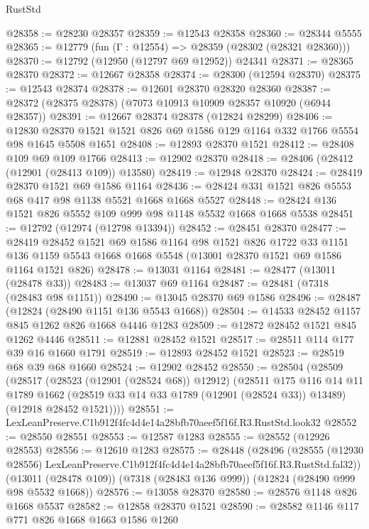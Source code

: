 \begin{lexlean}{RustStd}
\begin{coremodule}
@28358 := @28230 @28357
@28359 := @12543 @28358
@28360 := @28344 @5555
@28365 := @12779 (fun (Γ : @12554) => @28359 (@28302 (@28321 @28360)))
@28370 := @12792 (@12950 (@12797 @69 @12952)) @24341
@28371 := @28365 @28370
@28372 := @12667 @28358
@28374 := @28300 (@12594 @28370)
@28375 := @12543 @28374
@28378 := @12601 @28370 @28320 @28360
@28387 := @28372 (@28375 @28378) (@7073 @10913 @10909 @28357 @10920 (@6944 @28357))
@28391 := @12667 @28374 @28378 (@12824 @28299)
@28406 := @12830 @28370 @1521 @1521 @826 @69 @1586 @129 @1164 @332 @1766 @5554 @98 @1645 @5508 @1651
@28408 := @12893 @28370 @1521
@28412 := @28408 @109 @69 @109 @1766
@28413 := @12902 @28370
@28418 := @28406 (@28412 (@12901 (@28413 @109)) @13580)
@28419 := @12948 @28370
@28424 := @28419 @28370 @1521 @69 @1586 @1164
@28436 := @28424 @331 @1521 @826 @5553 @68 @417 @98 @1138 @5521 @1668 @1668 @5527
@28448 := @28424 @136 @1521 @826 @5552 @109 @999 @98 @1148 @5532 @1668 @1668 @5538
@28451 := @12792 (@12974 (@12798 @13394))
@28452 := @28451 @28370
@28477 := @28419
    @28452
    @1521
    @69
    @1586
    @1164
    @98
    @1521
    @826
    @1722
    @33
    @1151
    @136
    @1159
    @5543
    @1668
    @1668
    @5548
    (@13001 @28370 @1521 @69 @1586 @1164 @1521 @826)
@28478 := @13031 @1164
@28481 := @28477 (@13011 (@28478 @33))
@28483 := @13037 @69 @1164
@28487 := @28481 (@7318 (@28483 @98 @1151))
@28490 := @13045 @28370 @69 @1586
@28496 := @28487 (@12824 (@28490 @1151 @136 @5543 @1668))
@28504 := @14533 @28452 @1157 @845 @1262 @826 @1668 @4446 @1283
@28509 := @12872 @28452 @1521 @845 @1262 @4446
@28511 := @12881 @28452 @1521
@28517 := @28511 @114 @177 @39 @16 @1660 @1791
@28519 := @12893 @28452 @1521
@28523 := @28519 @68 @39 @68 @1660
@28524 := @12902 @28452
@28550 := @28504
    (@28509
      (@28517
        (@28523 (@12901 (@28524 @68)) @12912)
        (@28511
          @175
          @116
          @14
          @11
          @1789
          @1662
          (@28519 @33 @14 @33 @1789 (@12901 (@28524 @33)) @13489)
          (@12918 @28452 @1521))))
@28551 := LexLeanPreserve.C1b912f4fc4d4e14a28bfb70aeef5f16f.R3.RustStd.look32
@28552 := @28550 @28551
@28553 := @12587 @1283
@28555 := @28552 (@12926 @28553)
@28556 := @12610 @1283
@28575 := @28448
    (@28496
      (@28555 (@12930 @28556) LexLeanPreserve.C1b912f4fc4d4e14a28bfb70aeef5f16f.R3.RustStd.fal32))
    (@13011 (@28478 @109))
    (@7318 (@28483 @136 @999))
    (@12824 (@28490 @999 @98 @5532 @1668))
@28576 := @13058 @28370
@28580 := @28576 @1148 @826 @1668 @5537
@28582 := @12858 @28370 @1521
@28590 := @28582 @1146 @117 @771 @826 @1668 @1663 @1586 @1260

\end{coremodule}
\end{lexlean}
